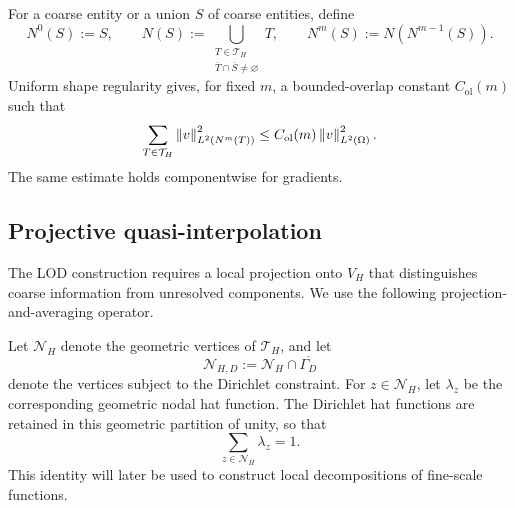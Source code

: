 For a coarse entity or a union $S$ of coarse entities, define
\begin{equation}
\label{eq:patch-definition}
  N^0(S):=S,
  \qquad
  N(S):=
  \bigcup_{\substack{T\in\mathcal T_H\\
                     \overline T\cap\overline S\neq\varnothing}}T,
  \qquad
  N^m(S):=N(N^{m-1}(S)).
\end{equation}
Uniform shape regularity gives, for fixed $m$, a bounded-overlap constant
$C_{\mathrm{ol}}(m)$ such that
\begin{equation}
\label{eq:patch-overlap}
  \sum_{T\in\mathcal T_H}
  \left\lVert v\right\rVert_{L^2(N^m(T))}^2
  \leq C_{\mathrm{ol}}(m)\left\lVert v\right\rVert_{L^2(\Omega)}^2.
\end{equation}
The same estimate holds componentwise for gradients.

\subsection{Projective quasi-interpolation}
\label{sec:interpolation}

The LOD construction requires a local projection onto $V_H$ that
distinguishes coarse information from unresolved components. We use the
following projection-and-averaging operator.

Let $\mathcal N_H$ denote the geometric vertices of $\mathcal T_H$, and
let
\[
  \mathcal N_{H,D}
  :=
  \mathcal N_H\cap\overline{\Gamma_D}
\]
denote the vertices subject to the Dirichlet constraint. For
$z\in\mathcal N_H$, let $\lambda_z$ be the corresponding geometric
nodal hat function. The Dirichlet hat functions are retained in this
geometric partition of unity, so that
\begin{equation}
\label{eq:geometric-partition-unity}
  \sum_{z\in\mathcal N_H}\lambda_z=1.
\end{equation}
This identity will later be used to construct local decompositions of
fine-scale functions.

